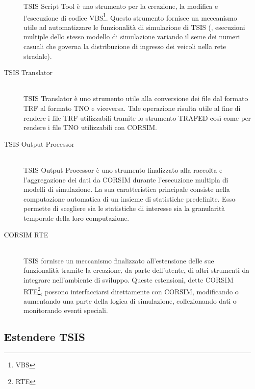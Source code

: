 \begin{description}
\acs{TSIS} Script Tool è uno strumento per la creazione, la modifica e l'esecuzione di codice \acs{VBS}\footnote{\acf{VBS}}. Questo strumento fornisce un meccanismo utile ad automatizzare le funzionalità di simulazione di \acs{TSIS} (\eg{}, esecuzioni multiple dello stesso modello di simulazione variando il seme dei numeri casuali che governa la distribuzione di ingresso dei veicoli nella rete stradale).
\item[TSIS Translator] \hfill \\
\acs{TSIS} Translator è uno strumento utile alla conversione dei file dal formato \acs{TRF} al formato \acs{TNO} e viceversa. Tale operazione risulta utile al fine di rendere i file \acs{TRF} utilizzabili tramite lo strumento \acs{TRAFED} così come per rendere i file \acs{TNO} utilizzabili con \acs{CORSIM}.
\item[TSIS Output Processor] \hfill \\
\acs{TSIS} Output Processor è uno strumento finalizzato alla raccolta e l'aggregazione dei dati da \acs{CORSIM} durante l'esecuzione multipla di modelli di simulazione. La sua caratteristica principale consiste nella computazione automatica di un insieme di statistiche predefinite. Esso permette di scegliere sia le statistiche di interesse sia la granularità temporale della loro computazione.
\item[CORSIM RTE] \hfill \\
\acs{TSIS} fornisce un meccanismo finalizzato all'estensione delle sue funzionalità tramite la creazione, da parte dell'utente, di altri strumenti da integrare nell'ambiente di sviluppo. Queste estensioni, dette \acs{CORSIM} \acs{RTE}\footnote{\acf{RTE}}, possono interfacciarsi direttamente con \acs{CORSIM}, modificando o aumentando una parte della logica di simulazione, collezionando dati o monitorando eventi speciali.
\end{description}

\subsection{Estendere TSIS}

